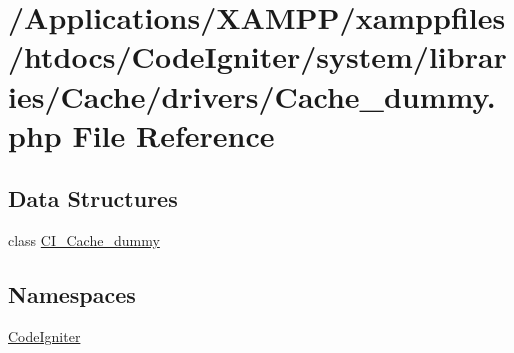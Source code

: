 \hypertarget{_cache__dummy_8php}{}\section{/\+Applications/\+X\+A\+M\+P\+P/xamppfiles/htdocs/\+Code\+Igniter/system/libraries/\+Cache/drivers/\+Cache\+\_\+dummy.php File Reference}
\label{_cache__dummy_8php}
\subsection*{Data Structures}
\begin{DoxyCompactItemize}
\item 
class \mbox{\hyperlink{class_c_i___cache__dummy}{C\+I\+\_\+\+Cache\+\_\+dummy}}
\end{DoxyCompactItemize}
\subsection*{Namespaces}
\begin{DoxyCompactItemize}
\item 
 \mbox{\hyperlink{namespace_code_igniter}{Code\+Igniter}}
\end{DoxyCompactItemize}
